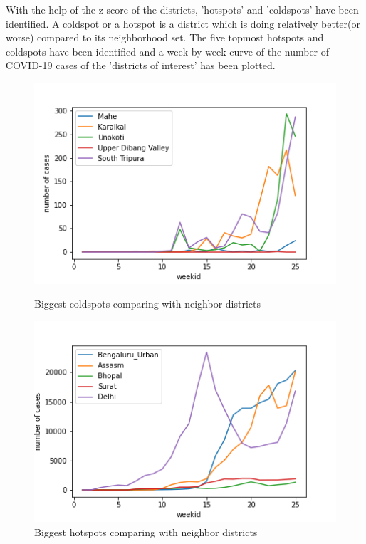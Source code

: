 \documentclass[a4paper,11pt]{article}
\begin{document}
With the help of the z-score of the districts, 'hotspots' and 'coldspots' have been identified. A coldspot or a hotspot is a district which is doing relatively better(or worse) compared to its neighborhood set. The five topmost hotspots and coldspots have been identified and a week-by-week curve of the number of COVID-19 cases of the 'districts of interest' has been plotted.



\begin{figure}[!tbp]
  \centering
  \begin{minipage}[b]{0.45\textwidth}
    \includegraphics[width=\textwidth]{neighbor-coldspot.png}
    \caption{Biggest coldspots comparing with neighbor districts}
  \end{minipage}
  \hfill
  \begin{minipage}[b]{0.45\textwidth}
    \includegraphics[width=\textwidth]{neighbor-hotspot.png}
    \caption{Biggest hotspots comparing with neighbor districts}
  \end{minipage}
\end{figure}
\end{document}
